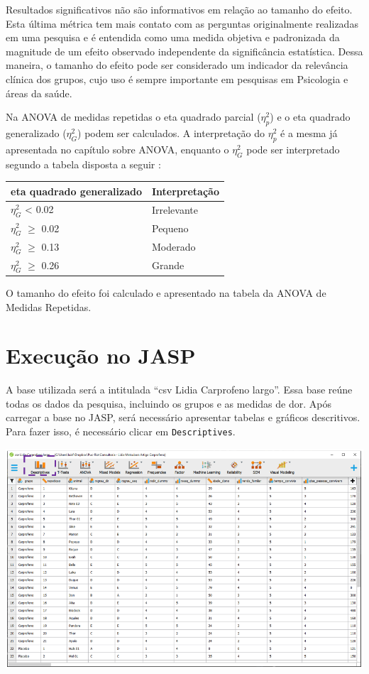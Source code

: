 \documentclass[
]{book}
\begin{document}
Resultados significativos não são informativos em relação ao tamanho do efeito. Esta última métrica tem mais contato com as perguntas originalmente realizadas em uma pesquisa e é entendida como uma medida objetiva e padronizada da magnitude de um efeito observado independente da significância estatística. Dessa maneira, o tamanho do efeito pode ser considerado um indicador da relevância clínica dos grupos, cujo uso é sempre importante em pesquisas em Psicologia e áreas da saúde.

Na ANOVA de medidas repetidas o eta quadrado parcial (\(\eta_p^2\)) e o eta quadrado generalizado (\(\eta^2_G\)) podem ser calculados. A interpretação do \(\eta_p^2\) é a mesma já apresentada no capítulo sobre ANOVA, enquanto o \(\eta^2_G\) pode ser interpretado segundo a tabela disposta a seguir \citep{draper_2020}:

\begin{longtable}[]{@{}ll@{}}
\toprule
eta quadrado generalizado & Interpretação \\
\midrule
\endhead
\(\eta^2_G\) \textless{} 0.02 & Irrelevante \\
\(\eta^2_G\) \(\geq\) 0.02 & Pequeno \\
\(\eta^2_G\) \(\geq\) 0.13 & Moderado \\
\(\eta^2_G\) \(\geq\) 0.26 & Grande \\
\bottomrule
\end{longtable}

O tamanho do efeito foi calculado e apresentado na tabela da ANOVA de Medidas Repetidas.

\hypertarget{execuuxe7uxe3o-no-jasp-12}{%
\section{Execução no JASP}\label{execuuxe7uxe3o-no-jasp-12}}

A base utilizada será a intitulada ``csv Lidia Carprofeno largo''. Essa base reúne todas os dados da pesquisa, incluindo os grupos e as medidas de dor. Após carregar a base no JASP, será necessário apresentar tabelas e gráficos descritivos. Para fazer isso, é necessário clicar em \texttt{Descriptives}.

\includegraphics{./img/cap_anovarm_descriptives.png}
\end{document}
